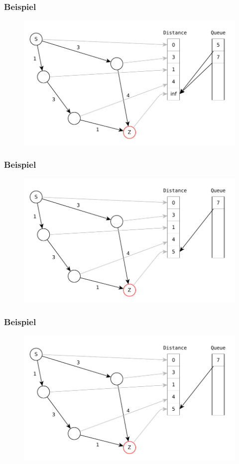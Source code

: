 \begin{frame}
\frametitle{Beispiel}
\begin{figure}
\includegraphics[scale=.8]{dijkstra_graphs/dijkstra_8.pdf}
\end{figure}
\end{frame}

\begin{frame}
\frametitle{Beispiel}
\begin{figure}
\includegraphics[scale=.8]{dijkstra_graphs/dijkstra_9.pdf}
\end{figure}
\end{frame}

\begin{frame}
\frametitle{Beispiel}
\begin{figure}
\includegraphics[scale=.8]{dijkstra_graphs/dijkstra_A.pdf}
\end{figure}
\end{frame}

